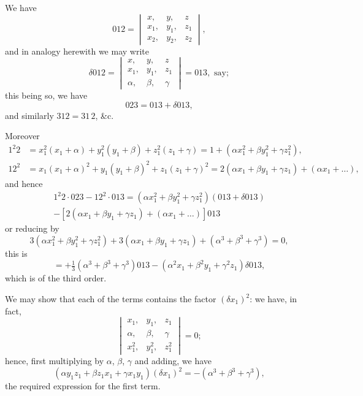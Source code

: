 \documentclass[11pt,a4paper]{book}
\begin{document}
\begin{art}\label{art:100}
We have
\[
012 = \begin{vmatrix} x, & y, & z \\ x_1, & y_1, & z_1 \\ x_2, & y_2, & z_2 \end{vmatrix},
\]
and in analogy herewith we may write
\[
\delta 012 = \begin{vmatrix} x, & y, & z \\ x_1, & y_1, & z_1 \\ \alpha, & \beta, & \gamma \end{vmatrix} = 013, \text{ say};
\]
this being so, we have
\[
023 = 013 + \delta 013,
\]
and similarly $312 = 31\,2$, \&c.

Moreover
\begin{align*}
1^2 2 &= x_1^2(x_1 + \alpha) + y_1^2(y_1 + \beta) + z_1^2(z_1 + \gamma) = 1 + (\alpha x_1^2 + \beta y_1^2 + \gamma z_1^2),\\
12^2 &= x_1(x_1 + \alpha)^2 + y_1(y_1 + \beta)^2 + z_1(z_1 + \gamma)^2 = 2(\alpha x_1 + \beta y_1 + \gamma z_1) + (\alpha x_1 + \ldots),
\end{align*}
and hence
\begin{multline*}
1^2 2 \cdot 023 - 12^2 \cdot 013 = (\alpha x_1^2 + \beta y_1^2 + \gamma z_1^2)(013 + \delta 013) \\
- [2(\alpha x_1 + \beta y_1 + \gamma z_1) + (\alpha x_1 + \ldots)]013
\end{multline*}
or reducing by
\[
3(\alpha x_1^2 + \beta y_1^2 + \gamma z_1^2) + 3(\alpha x_1 + \beta y_1 + \gamma z_1) + (\alpha^3 + \beta^3 + \gamma^3) = 0,
\]
this is
\[
= +\tfrac{1}{3}(\alpha^3 + \beta^3 + \gamma^3)013 - (\alpha^2 x_1 + \beta^2 y_1 + \gamma^2 z_1)\delta 013,
\]
which is of the third order.
\end{art}

\newpage
\begin{art}\label{art:101}
We may show that each of the terms contains the factor $(\delta x_1)^2$: we have, in fact,
\[
\begin{vmatrix} x_1, & y_1, & z_1 \\ \alpha, & \beta, & \gamma \\ x_1^2, & y_1^2, & z_1^2 \end{vmatrix} = 0;
\]
hence, first multiplying by $\alpha$, $\beta$, $\gamma$ and adding, we have
\[
(\alpha y_1 z_1 + \beta z_1 x_1 + \gamma x_1 y_1)(\delta x_1)^2 = -(\alpha^3 + \beta^3 + \gamma^3),
\]
the required expression for the first term.
\end{art}
\end{document}
